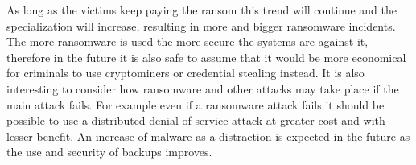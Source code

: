\linej
As long as the victims keep paying the ransom this trend will continue and the specialization will increase, resulting in more and bigger ransomware incidents.
The more ransomware is used the more secure the systems are against it, therefore in the future it is also safe to assume that it would be more economical for criminals to use cryptominers or credential stealing instead\cite{ransomware_malwarebytes}.
\linej
\linej
It is also interesting to consider how ransomware and other attacks may take place if the main attack fails.
For example even if a ransomware attack fails it should be possible to use a distributed denial of service attack at greater cost and with lesser benefit.
An increase of malware as a distraction is expected in the future as the use and security of backups improves\cite{ransomware_economy}.

